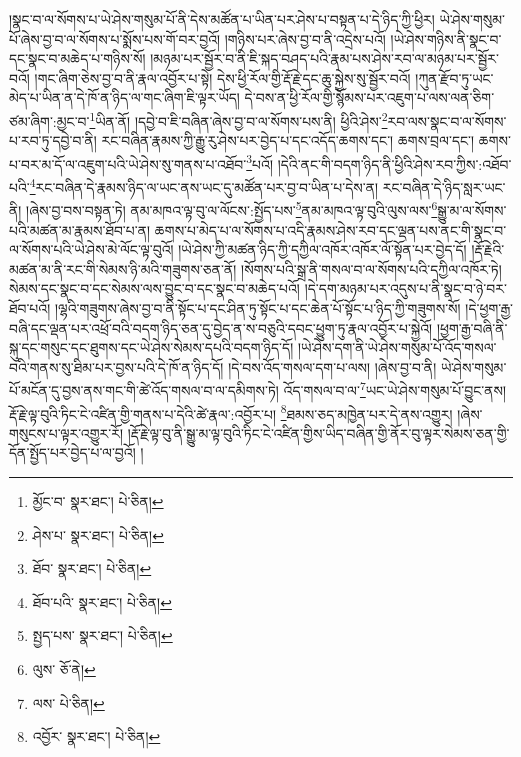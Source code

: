 །སྣང་བ་ལ་སོགས་པ་ཡེ་ཤེས་གསུམ་པོ་ནི་དེས་མཚོན་པ་ཡིན་པར་ཤེས་པ་བསྟན་པ་དེ་ཉིད་ཀྱི་ཕྱིར། ཡེ་ཤེས་གསུམ་པོ་ཞེས་བྱ་བ་ལ་སོགས་པ་སྨོས་པས་གོ་བར་བྱའོ། །གཉིས་པར་ཞེས་བྱ་བ་ནི་འདྲེས་པའོ། །ཡེ་ཤེས་གཉིས་ནི་སྣང་བ་དང་སྣང་བ་མཆེད་པ་གཉིས་སོ། །མཉམ་པར་སྦྱོར་བ་ནི་ཇི་སྐད་བཤད་པའི་རྣམ་པས་ཤེས་རབ་ལ་མཉམ་པར་སྦྱོར་བའོ། །གང་ཞིག་ཅེས་བྱ་བ་ནི་རྣལ་འབྱོར་པ་སྟེ། དེས་ཕྱི་རོལ་གྱི་རྡོ་རྗེ་དང་ཆུ་སྐྱེས་སུ་སྦྱོར་བའོ། །ཀུན་རྫོབ་ཏུ་ཡང་མེད་པ་ཡིན་ན་དེ་ཁོ་ན་ཉིད་ལ་གང་ཞིག་ཇི་ལྟར་ཡོད། དེ་བས་ན་ཕྱི་རོལ་གྱི་སྙོམས་པར་འཇུག་པ་ལས་ལན་ཅིག་ཙམ་ཞིག་:མྱང་བ་\footnote{མྱོང་བ་  སྣར་ཐང་།  པེ་ཅིན། }ཡིན་ནོ། །དབྱེ་བ་ཇི་བཞིན་ཞེས་བྱ་བ་ལ་སོགས་པས་ནི། ཕྱིའི་ཤེས་\footnote{ཤེས་པ་  སྣར་ཐང་།  པེ་ཅིན། }རབ་ལས་སྣང་བ་ལ་སོགས་པ་རབ་ཏུ་དབྱེ་བ་ནི། རང་བཞིན་རྣམས་ཀྱི་རྒྱུ་རུ་ཤེས་པར་བྱེད་པ་དང་འདོད་ཆགས་དང་། ཆགས་བྲལ་དང་། ཆགས་པ་བར་མ་དོ་ལ་འཇུག་པའི་ཡེ་ཤེས་སུ་གནས་པ་འཐོབ་\footnote{ཐོབ་  སྣར་ཐང་།  པེ་ཅིན། }པའོ། །དེའི་ནང་གི་བདག་ཉིད་ནི་ཕྱིའི་ཤེས་རབ་ཀྱིས་:འཐོབ་པའི་\footnote{ཐོབ་པའི་  སྣར་ཐང་།  པེ་ཅིན། }རང་བཞིན་དེ་རྣམས་ཉིད་ལ་ཡང་ནས་ཡང་དུ་མཚོན་པར་བྱ་བ་ཡིན་པ་དེས་ན། རང་བཞིན་དེ་ཉིད་སླར་ཡང་ནི། །ཞེས་བྱ་བས་བསྟན་ཏེ། ནམ་མཁའ་ལྟ་བུ་ལ་ལོངས་:སྤྱོད་པས་\footnote{སྤྱད་པས་  སྣར་ཐང་།  པེ་ཅིན། }ནམ་མཁའ་ལྟ་བུའི་ལུས་ལས་\footnote{ལུས་  ཅོ་ནེ། }སྒྱུ་མ་ལ་སོགས་པའི་མཚན་མ་རྣམས་ཐོབ་པ་ན། ཆགས་པ་མེད་པ་ལ་སོགས་པ་འདི་རྣམས་ཤེས་རབ་དང་ལྡན་པས་ནང་གི་སྣང་བ་ལ་སོགས་པའི་ཡེ་ཤེས་མེ་ལོང་ལྟ་བུའོ། །ཡེ་ཤེས་ཀྱི་མཚན་ཉིད་ཀྱི་དཀྱིལ་འཁོར་འཁོར་ལོ་སྟོན་པར་བྱེད་དོ། །རྡོ་རྗེའི་མཚན་མ་ནི་རང་གི་སེམས་ཉི་མའི་གཟུགས་ཅན་ནོ། །སོགས་པའི་སྒྲ་ནི་གསལ་བ་ལ་སོགས་པའི་དཀྱིལ་འཁོར་ཏེ། སེམས་དང་སྣང་བ་དང་སེམས་ལས་བྱུང་བ་དང་སྣང་བ་མཆེད་པའོ། །དེ་དག་མཉམ་པར་འདུས་པ་ནི་སྣང་བ་ཉེ་བར་ཐོབ་པའོ། །ལྷའི་གཟུགས་ཞེས་བྱ་བ་ནི་སྟོང་པ་དང་ཤིན་ཏུ་སྟོང་པ་དང་ཆེན་པོ་སྟོང་པ་ཉིད་ཀྱི་གཟུགས་སོ། །དེ་ཕྱག་རྒྱ་བཞི་དང་ལྡན་པར་འཕྲོ་བའི་བདག་ཉིད་ཅན་དུ་བྱེད་ན་ས་བཅུའི་དབང་ཕྱུག་ཏུ་རྣལ་འབྱོར་པ་སྐྱེའོ། །ཕྱག་རྒྱ་བཞི་ནི་སྐུ་དང་གསུང་དང་ཐུགས་དང་ཡེ་ཤེས་སེམས་དཔའི་བདག་ཉིད་དོ། །ཡེ་ཤེས་དག་ནི་ཡེ་ཤེས་གསུམ་པོ་འོད་གསལ་བའི་གནས་སུ་ཐིམ་པར་བྱས་པའི་དེ་ཁོ་ན་ཉིད་དོ། །དེ་བས་འོད་གསལ་དག་པ་ལས། །ཞེས་བྱ་བ་ནི། ཡེ་ཤེས་གསུམ་པོ་མངོན་དུ་བྱས་ནས་གང་གི་ཚེ་འོད་གསལ་བ་ལ་དམིགས་ཏེ། འོད་གསལ་བ་ལ་\footnote{ལས་  པེ་ཅིན། }ཡང་ཡེ་ཤེས་གསུམ་པོ་བྱུང་ནས། རྡོ་རྗེ་ལྟ་བུའི་ཏིང་ངེ་འཛིན་གྱི་གནས་པ་དེའི་ཚེ་རྣལ་:འབྱོར་པ། \footnote{འབྱོར་  སྣར་ཐང་།  པེ་ཅིན། }ཐམས་ཅད་མཁྱེན་པར་དེ་ནས་འགྱུར། །ཞེས་གསུངས་པ་ལྟར་འགྱུར་རོ། །རྡོ་རྗེ་ལྟ་བུ་ནི་སྒྱུ་མ་ལྟ་བུའི་ཏིང་ངེ་འཛིན་གྱིས་ཡིད་བཞིན་གྱི་ནོར་བུ་ལྟར་སེམས་ཅན་གྱི་དོན་སྤྱོད་པར་བྱེད་པ་ལ་བྱའོ། །
